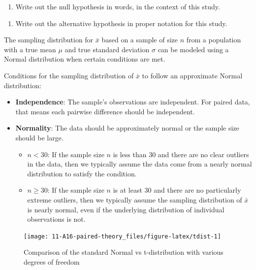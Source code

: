 \documentclass[
]{report}
\providecommand{\tightlist}{%
  \setlength{\itemsep}{0pt}\setlength{\parskip}{0pt}}
\begin{document}
\begin{enumerate}
\def\labelenumi{\arabic{enumi}.}
\setcounter{enumi}{2}
\tightlist
\item
  Write out the null hypothesis in words, in the context of this study.
\end{enumerate}

\vspace{0.8in}

\begin{enumerate}
\def\labelenumi{\arabic{enumi}.}
\setcounter{enumi}{3}
\tightlist
\item
  Write out the alternative hypothesis in proper notation for this study.
\end{enumerate}

\vspace{0.5in}

The sampling distribution for \(\bar{x}\) based on a sample of size \(n\) from a population with a true mean \(\mu\) and true standard deviation \(\sigma\) can be modeled using a Normal distribution when certain conditions are met.

Conditions for the sampling distribution of \(\bar{x}\) to follow an approximate Normal distribution:

\begin{itemize}
\item
  \textbf{Independence}: The sample's observations are independent. For paired data, that means each pairwise difference should be independent.
\item
  \textbf{Normality}: The data should be approximately normal or the sample size should be large.

  \begin{itemize}
  \item
    \(n < 30\): If the sample size \(n\) is less than 30 and there are no clear outliers in the data, then we typically assume the data come from a nearly normal distribution to satisfy the condition.
  \item
    \(n \geq 30\): If the sample size \(n\) is at least 30 and there are no particularly extreme outliers, then we typically assume the sampling distribution of \(\bar{x}\) is nearly normal, even if the underlying distribution of individual observations is not.
  \end{itemize}
\end{itemize}

\begin{figure}

{\centering \texttt{[image: 11-A16-paired-theory\_files/figure-latex/tdist-1]} 

}

\caption{Comparison of the standard Normal vs t-distribution with various degrees of freedom}\label{fig:tdist}
\end{figure}
\end{document}
